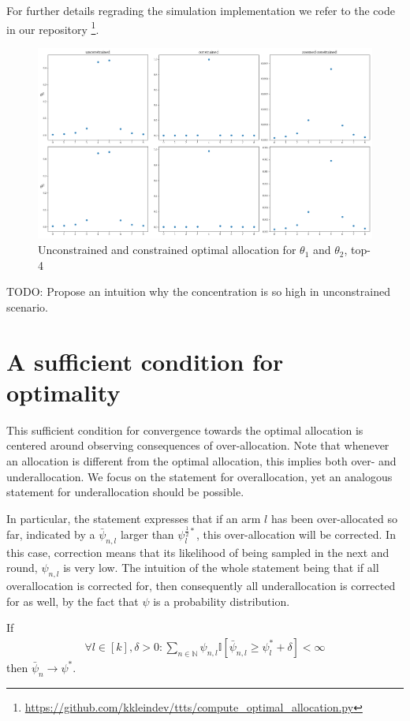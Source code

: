 For further details regrading the simulation implementation we refer to the code in our repository \footnote{\url{https://github.com/kkleindev/ttts/compute_optimal_allocation.py}}.

\begin{figure}[h]
  \centering
  \includegraphics[width=\textwidth]{optimal_allocation.png}
  \caption{Unconstrained and constrained optimal allocation for $\theta_1$ and $\theta_2$, top-4}
  \label{fig:optimal_allocation}
\end{figure}

TODO: Propose an intuition why the concentration is so high in unconstrained scenario.

\section{A sufficient condition for optimality}\label{section:optimality_sufficient_condition}
This sufficient condition for convergence towards the optimal allocation is centered around observing consequences of over-allocation. Note that whenever an allocation is different from the optimal allocation, this implies both over- and underallocation. We focus on the statement for overallocation, yet an analogous statement for underallocation should be possible.

In particular, the statement expresses that if an arm $l$ has been over-allocated so far, indicated by a $\bar{\psi}_{n, l}$ larger than $\psi^{\frac{1}{2}*}_l$, this over-allocation will be corrected. In this case, correction means that its likelihood of being sampled in the next and round, $\psi_{n, l}$ is very low. The intuition of the whole statement being that if all overallocation is corrected for, then consequently all underallocation is corrected for as well, by the fact that $\psi$ is a probability distribution.
\begin{proposition}\label{proposition:optimality_sufficient_condition}
  If
  \begin{align}
    \forall l \in [k], \delta > 0: \sum_{n \in \mathbb{N}} \psi_{n, l} \mathbb{I}[\bar{\psi}_{n, l} \geq \psi^*_l + \delta] < \infty \label{eq:sufficient_condition}
  \end{align}
  then $\bar{\psi}_{n} \rightarrow \psi^*$.
\end{proposition}

